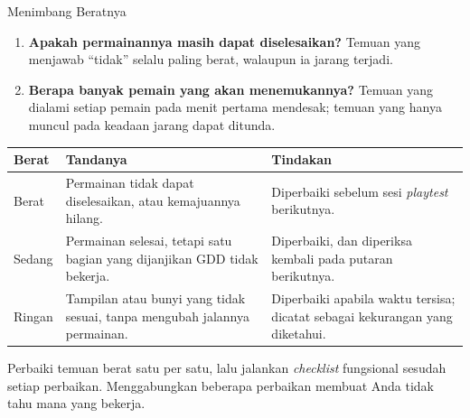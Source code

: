 \documentclass[aspectratio=169,10pt]{beamer}
\begin{document}
\begin{frame}{Menimbang Beratnya}
\begin{enumerate}
  \item \textbf{Apakah permainannya masih dapat diselesaikan?} Temuan yang
        menjawab ``tidak'' selalu paling berat, walaupun ia jarang terjadi.
  \item \textbf{Berapa banyak pemain yang akan menemukannya?} Temuan yang
        dialami setiap pemain pada menit pertama mendesak; temuan yang hanya
        muncul pada keadaan jarang dapat ditunda.
\end{enumerate}
\vspace{0.10cm}
{\scriptsize
\renewcommand{\arraystretch}{1.12}
\begin{tabularx}{\textwidth}{@{}>{\raggedright\arraybackslash}p{1.55cm}
    >{\raggedright\arraybackslash}p{5.20cm}
    >{\raggedright\arraybackslash}X@{}}
\toprule
\textbf{Berat} & \textbf{Tandanya} & \textbf{Tindakan} \\
\midrule
Berat & Permainan tidak dapat diselesaikan, atau kemajuannya hilang. &
  Diperbaiki sebelum sesi \emph{playtest} berikutnya. \\
\addlinespace
Sedang & Permainan selesai, tetapi satu bagian yang dijanjikan GDD tidak
  bekerja. & Diperbaiki, dan diperiksa kembali pada putaran berikutnya. \\
\addlinespace
Ringan & Tampilan atau bunyi yang tidak sesuai, tanpa mengubah jalannya
  permainan. & Diperbaiki apabila waktu tersisa; dicatat sebagai kekurangan
  yang diketahui. \\
\bottomrule
\end{tabularx}}
\begin{kiat}
Perbaiki temuan berat satu per satu, lalu jalankan \emph{checklist} fungsional
sesudah setiap perbaikan. Menggabungkan beberapa perbaikan membuat Anda tidak
tahu mana yang bekerja.
\end{kiat}
\end{frame}
\end{document}
